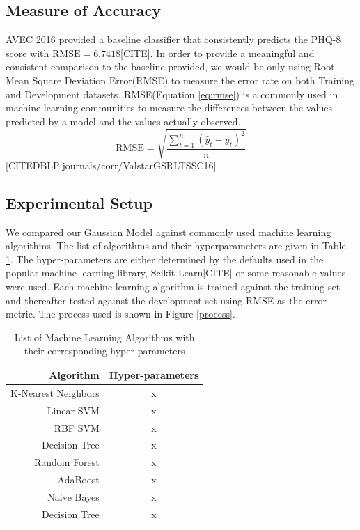 \documentclass{article}
\begin{document}
 	\subsection{Measure of Accuracy}
	AVEC 2016 provided a baseline classifier that consistently predicts the PHQ-8 score with $\text{RMSE}=6.7418$[CITE]. In order to provide a meaningful and consistent comparison to the baseline provided, we would be only using Root Mean Square Deviation Error(RMSE) to measure the error rate on both Training and Development datasets. RMSE(Equation \ref{eq:rmse}) is a commonly used in machine learning communities to measure the differences between the values predicted by a model and the values actually observed. 
	\begin{equation}\label{eq:rmse}
  	\text{RMSE} = \sqrt{\frac{\sum_{t=1}^n (\hat y_t - y_t)^2}{n}}
 	\end{equation}
	[CITEDBLP:journals/corr/ValstarGSRLTSSC16]

	\subsection{Experimental Setup}
	We compared our Gaussian Model against commonly used machine learning algorithms. The list of algorithms and their hyperparameters are given in Table \ref{list_mls}. The hyper-parameters are either determined by the defaults used in the popular machine learning library, Scikit Learn[CITE] or some reasonable values were used. Each machine learning algorithm is trained against the training set and thereafter tested against the development set using RMSE as the error metric. The process used is shown in Figure \ref{process}.

	\begin{table}[h]
  		\begin{center}
   			\begin{tabular}{ | r | c |}
	    		\hline
			Algorithm & Hyper-parameters \\ \hline\hline
			K-Nearest Neighbors        & x \\ \hline
			Linear SVM                 & x \\ \hline
			RBF SVM                    & x \\ \hline
			Decision Tree              & x \\ \hline
			Random Forest              & x \\ \hline
			AdaBoost                   & x \\ \hline
			Naive Bayes                & x \\ \hline
			Decision Tree              & x \\ \hline
			\end{tabular}
		\end{center}
		\caption{List of Machine Learning Algorithms with their corresponding hyper-parameters}
		\label{list_mls}
	\end{table}
\end{document}
